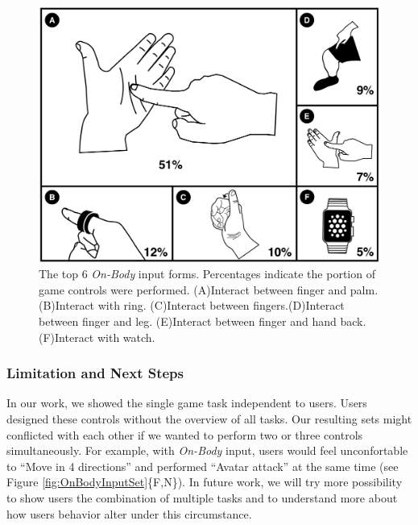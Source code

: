 \documentclass{sigchi}
\begin{document}
 \begin{figure}[!h]
  \centering
  \includegraphics[width=1\columnwidth]{OnBodyForms.pdf}
  \caption{The top 6 \emph{On-Body} input forms. Percentages indicate the portion of game controls were performed. (A)Interact between finger and palm. (B)Interact with ring. (C)Interact between fingers.(D)Interact between finger and leg. (E)Interact between finger and hand back. (F)Interact with watch.}
  \label{fig:figureOnBodyPorpotion}
  \end{figure}   

  \subsubsection{Limitation and Next Steps}

  In our work, we showed the single game task independent to users. Users designed these controls without the overview of all tasks. Our resulting sets might conflicted with each other if we wanted to perform two or three controls simultaneously. For example, with \emph{On-Body} input, users would feel unconfortable to ``Move in 4 directions'' and performed ``Avatar attack'' at the same time (see Figure \ref{fig:OnBodyInputSet}\{F,N\}). In future work, we will try more possibility to show users the combination of multiple tasks and to understand more about how users behavior alter under this circumstance.
\end{document}
